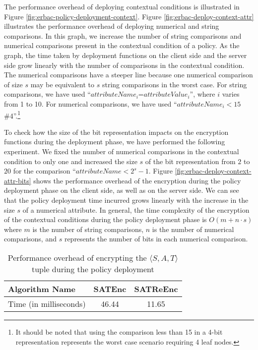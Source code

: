 \documentclass[epsfig,a4paper,11pt,titlepage]{book}
\numberwithin{algorithm}{chapter}
\begin{document}
The performance overhead of deploying contextual conditions is illustrated in Figure \ref{fig:erbac-policy-deployment-context}. Figure \ref{fig:erbac-deploy-context-attr} illustrates the performance overhead of deploying numerical and string comparisons. In this graph, we increase the number of string comparisons and numerical comparisons present in the contextual condition of a policy. As the graph, the time taken by deployment functions on the client side and the server side grow linearly with the number of comparisons in the contextual condition. The numerical comparisons have a steeper line because one numerical comparison of size $s$ may be equivalent to $s$ string comparisons in the worst case. For string comparisons, we have used ``$attributeName_i$=$attributeValue_i$'', where $i$ varies from 1 to 10. For numerical comparisons, we have used ``$attributeName_i<15$\#4''.\footnote{It should be noted that using the comparison less than 15 in a 4-bit representation represents the worst case scenario requiring 4 leaf nodes.}

To check how the size of the bit representation impacts on the encryption functions during the deployment phase, we have performed the following experiment. We fixed the number of numerical comparisons in the contextual condition to only one and increased the size $s$ of the bit representation from $2$ to $20$ for the comparison ``$attributeName<2^s-1$. Figure \ref{fig:erbac-deploy-context-attr-bits} shows the performance overhead of the encryption during the policy deployment phase on the client side, as well as on the server side. We can see that the policy deployment time incurred grows linearly with the increase in the size $s$ of a numerical attribute. In general, the time complexity of the encryption of the contextual conditions during the policy deployment phase is $O (m + n \cdot s)$ where $m$ is the number of string comparisons, $n$ is the number of numerical comparisons, and $s$ represents the number of bits in each numerical comparison.

\begin{table} [htp]
\centering
\caption[Performance overhead of deploying the $\langle S, A, T \rangle$ tuple]{Performance overhead of encrypting the $\langle S, A, T \rangle$ tuple during the policy deployment}
\label{tab:espoon-sat-pol-deployment}
\begin{tabular}{ |l|c|c| }
\hline
\textbf{Algorithm Name} & \textbf{SATEnc} & \textbf{SATReEnc} \\ \hline
Time (in milliseconds) & 46.44 & 11.65 \\ \hline
\end{tabular}
\end{table}
\end{document}
